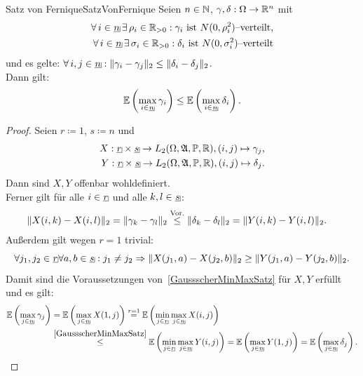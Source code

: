 \begin{korollar}{Satz von Fernique}{SatzVonFernique}
Seien $n \in \mathbb{N}$, $\gamma, \delta : \Omega \rightarrow \mathbb{R}^n$ mit
\begin{align*}
\forall\, i \in \haken n \, \exists\, \rho_i \in \R_{>0}:
\gamma_i \text{ ist } N(0, \rho_i^2)\text{--verteilt,}\\
\forall\, i \in \haken n \, \exists\, \sigma_i \in \R_{>0}:
\delta_i \text{ ist } N(0, \sigma_i^2)\text{--verteilt}
\end{align*}
und es gelte: $\forall\, i, j \in \haken n: \norm{\gamma_i - \gamma_j}_2 \le
\norm{\delta_i - \delta_j}_2$.\\
Dann gilt:
\[\E\left(\max_{i \in \haken n}\gamma_i \right)
\le \E\left(\max_{i \in \haken n}\delta_i \right)\text.\]
\end{korollar}
\begin{proof}
Seien $r\coloneqq  1$, $s \coloneqq  n$ und
\begin{align*}
X: \haken r \times \haken s \rightarrow L_2(\Omega, \mfa, \Prim, \R),
(i, j) \mapsto \gamma_j\text,\\
Y: \haken r \times \haken s \rightarrow L_2(\Omega, \mfa, \Prim, \R),
(i, j) \mapsto \delta_j\text.
\end{align*}
Dann sind $X, Y$ offenbar wohldefiniert.\\
Ferner gilt für alle $i \in \haken r$ und alle $k, l \in \haken s$:
\begin{align*}
\lVert X(i,k)-X(i,l)\rVert_2 &= \lVert\gamma_k - \gamma_l\rVert_2 \overset{\text{Vor.}}\le
\lVert\delta_k - \delta_l\rVert_2 = \lVert Y(i,k)- Y(i,l)\rVert_2\text.
\end{align*}
Außerdem gilt wegen $r = 1$ trivial:
\[\forall j_1, j_2 \in \haken r \forall a, b \in \haken s:
j_1\neq j_2\Rightarrow\norm{X(j_1, a)-X(j_2,b)}_2\ge 
\norm{Y(j_1, a)-Y(j_2,b)}_2 \text.\]
Damit sind die Voraussetzungen von~\ref{GaussscherMinMaxSatz} für $X,Y$
erfüllt und es gilt:
\begin{align*}
\E\left(\max_{j \in \haken n}\gamma_j \right) &=
\E\left(\max_{j \in \haken n}X(1, j) \right) \overset{r=1}=
\E\left(\min_{j \in \haken r}\max_{j \in \haken n}X(i, j) \right)\\
&\overset{\ref{GaussscherMinMaxSatz}}\le
\E\left(\min_{j \in \haken r}\max_{j \in \haken n}Y(i, j) \right)
= \E\left(\max_{j \in \haken n}Y(1, j) \right)
= \E\left(\max_{j \in \haken n}\delta_j \right)\text.
\end{align*}
\end{proof}